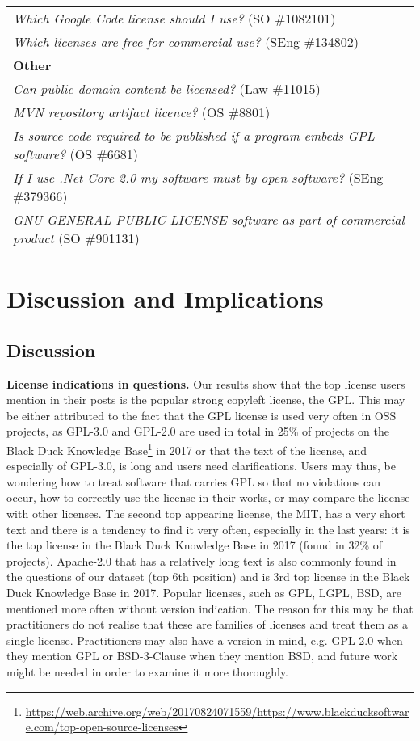 \documentclass{elsarticle}
\begin{document}
\begin{table}
\begin{adjustbox}{width=0.9\textwidth}
\begin{tabular}{l}
    \emph{Which Google Code license should I use?} (SO \#1082101) \\
    \emph{Which licenses are free for commercial use?} (SEng \#134802) \\
    \hline
    \textbf{Other} \\
    \emph{Can public domain content be licensed?} (Law \#11015) \\
    \emph{MVN repository artifact licence?} (OS \#8801) \\
    \emph{Is source code required to be published if a program embeds GPL software?} (OS \#6681) \\
    \emph{If I use .Net Core 2.0 my software must by open software?} (SEng \#379366) \\
    \emph{GNU GENERAL PUBLIC LICENSE software as part of commercial product} (SO \#901131) \\
  \hline
\end{tabular}
\end{adjustbox}
\end{table}

\section{Discussion and Implications}

\subsection{Discussion}

\textbf{License indications in questions.} Our results show that the top license users mention in their posts is the popular strong copyleft license, the GPL. This may be either attributed to the fact that the GPL license is used very often in OSS projects, as GPL-3.0 and GPL-2.0 are used in total in 25\% of projects on the Black Duck Knowledge Base\footnote{\url{https://web.archive.org/web/20170824071559/https://www.blackducksoftware.com/top-open-source-licenses}} in 2017 or that the text of the license, and especially of GPL-3.0, is long and users need clarifications. Users may thus, be wondering how to treat software that carries GPL so that no violations can occur, how to correctly use the license in their works, or may compare the license with other licenses. The second top appearing license, the MIT, has a very short text and there is a tendency to find it very often, especially in the last years: it is the top license in the Black Duck Knowledge Base in 2017 (found in 32\% of projects). Apache-2.0 that has a relatively long text is also commonly found in the questions of our dataset (top 6th position) and is 3rd top license in the Black Duck Knowledge Base in 2017. Popular licenses, such as GPL, LGPL, BSD, are mentioned more often without version indication. The reason for this may be that practitioners do not realise that these are families of licenses and treat them as a single license. Practitioners may also have a version in mind, e.g. GPL-2.0 when they mention GPL or BSD-3-Clause when they mention BSD, and future work might be needed in order to examine it more thoroughly.
\end{document}
